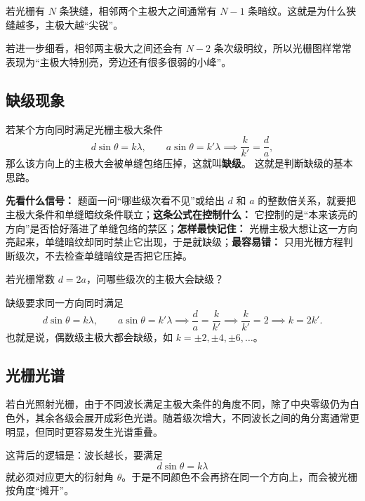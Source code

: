 \documentclass[lang=cn,11pt]{elegantbook}
\begin{document}
\begin{note}
若光栅有 \(N\) 条狭缝，相邻两个主极大之间通常有 \(N-1\) 条暗纹。这就是为什么狭缝越多，主极大越“尖锐”。
\par 若进一步细看，相邻两主极大之间还会有 \(N-2\) 条次级明纹，所以光栅图样常常表现为“主极大特别亮，旁边还有很多很弱的小峰”。
\end{note}

\subsection{缺级现象}

若某个方向同时满足光栅主极大条件
\[
d\sin\theta=k\lambda,\qquad a\sin\theta=k'\lambda
\implies
\frac{k}{k'}=\frac{d}{a},
\]
那么该方向上的主极大会被单缝包络压掉，这就叫\textbf{缺级}。
这就是判断缺级的基本思路。

\begin{note}
\textbf{先看什么信号：} 题面一问“哪些级次看不见”或给出 \(d\) 和 \(a\) 的整数倍关系，就要把主极大条件和单缝暗纹条件联立；\textbf{这条公式在控制什么：} 它控制的是“本来该亮的方向”是否恰好落进了单缝包络的禁区；\textbf{怎样最快记住：} 光栅主极大想让这一方向亮起来，单缝暗纹却同时禁止它出现，于是就缺级；\textbf{最容易错：} 只用光栅方程判断级次，不去检查单缝暗纹是否把它压掉。
\end{note}

\begin{example}[缺级判断]
若光栅常数 \(d=2a\)，问哪些级次的主极大会缺级？
\end{example}

\begin{solution}
缺级要求同一方向同时满足
\[
d\sin\theta=k\lambda,\qquad a\sin\theta=k'\lambda
\implies
\frac{d}{a}=\frac{k}{k'}
\implies
\frac{k}{k'}=2
\implies
k=2k'.
\]
也就是说，偶数级主极大都会缺级，如 \(k=\pm2,\pm4,\pm6,\dots\)。
\end{solution}

\subsection{光栅光谱}

若白光照射光栅，由于不同波长满足主极大条件的角度不同，除了中央零级仍为白色外，其余各级会展开成彩色光谱。随着级次增大，不同波长之间的角分离通常更明显，但同时更容易发生光谱重叠。

这背后的逻辑是：波长越长，要满足
\[
d\sin\theta=k\lambda
\]
就必须对应更大的衍射角 \(\theta\)。于是不同颜色不会再挤在同一个方向上，而会被光栅按角度“摊开”。
\end{document}
